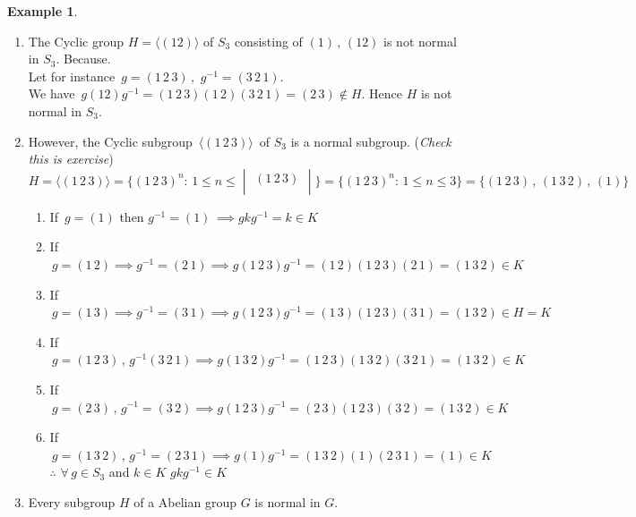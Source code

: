 \documentclass[11pt,a4paper]{article}
\theoremstyle{definition}
\newtheorem{exa}[thm]{Example}
\begin{document}
\begin{exa}
\begin{enumerate}
\item The Cyclic group $H = \langle(12)\rangle$ of $S_3$ consisting of $(1)\,,\, (12)$ is not normal in $S_3$. Because.\\
Let for instance $\, g = (1\, 2\, 3)\, , \,\, g^{-1} = (3\, 2\, 1)$.\\
We have $\, g(12)g^{-1} = (1\, 2\, 3)(1\,2)(3\,2\,1) = (2\,3) \not\in H$. Hence $H$ is not normal in  $S_3$.\\


\item However, the Cyclic subgroup $\, \langle (1\, 2\, 3)\rangle\,$ of $S_3$ is a normal subgroup. (\textit{Check this is exercise})\\

$H = \langle(1\, 2\, 3)\rangle = \big\{(1\,2\,3)^n:\, 1\leq n\leq \begin{vmatrix}
(1\, 2\, 3)\\
\end{vmatrix}\big\} = \big\{(1\,2\,3)^n:\, 1\leq n\leq 3\big\} = \big\{(1\,2\,3)\, ,\, (1\, 3\, 2)\, , \, (1)\big\}$
\begin{enumerate}
    \item If $\, g = (1)$ then $g^{-1} = (1)\,\implies gkg^{-1} = k\in K$
    \item If $\, g = (1\, 2) \implies g^{-1} = (2\,1) \implies g(1\, 2\, 3)g^{-1} = (1\,2)(1\, 2\, 3)(2\,1) = (1\,3\, 2)\in K$
    \item If $\, g= (1\,3) \implies g^{-1} = (3\, 1) \implies g(1\, 2\, 3)g^{-1} = (1\,3)(1\,2\,3)(3\,1) = (1\,3\,2)\in H = K$
    \item If $\, g = (1\,2\,3) \, , \, g^{-1}(3\, 2\, 1) \implies g(1\,3\,2)g^{-1} = (1\, 2\, 3)(1\,3\,2) (3\,2\,1) = (1\,3\,2)\in K$
    \item If $\, g = (2\,3)\,,\, g^{-1} = (3\,2) \implies g(1\, 2\, 3)g^{-1} = (2\, 3)(1\,2\,3)(3\,2) = (1\,3\, 2)\in K$
    \item If $\, g = (1\, 3\,2) \, , \, g^{-1} = (2\, 3\, 1)\implies g(1)g^{-1}  = (1\, 3\, 2) (1)(2\,3\,1) = (1)\in K $\\
    
          $\therefore\, \, \forall\, g\in S_3$ and $k\in K\,\, gkg^{-1}\in K$\\
\end{enumerate}


\item Every subgroup $H$ of a Abelian group $G$ is normal in $G$.\\



\end{enumerate}
\end{exa}
\end{document}
